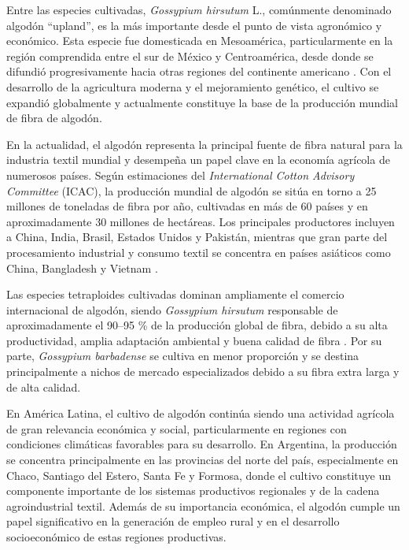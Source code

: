 \documentclass[12pt,oneside]{reedthesis}
\begin{document}
Entre las especies cultivadas, \emph{Gossypium hirsutum} L., comúnmente denominado algodón ``upland'', es la más importante desde el punto de vista agronómico y económico. Esta especie fue domesticada en Mesoamérica, particularmente en la región comprendida entre el sur de México y Centroamérica, desde donde se difundió progresivamente hacia otras regiones del continente americano \autocite{brubaker1999}. Con el desarrollo de la agricultura moderna y el mejoramiento genético, el cultivo se expandió globalmente y actualmente constituye la base de la producción mundial de fibra de algodón.

En la actualidad, el algodón representa la principal fuente de fibra natural para la industria textil mundial y desempeña un papel clave en la economía agrícola de numerosos países. Según estimaciones del \emph{International Cotton Advisory Committee} (ICAC), la producción mundial de algodón se sitúa en torno a 25 millones de toneladas de fibra por año, cultivadas en más de 60 países y en aproximadamente 30 millones de hectáreas. Los principales productores incluyen a China, India, Brasil, Estados Unidos y Pakistán, mientras que gran parte del procesamiento industrial y consumo textil se concentra en países asiáticos como China, Bangladesh y Vietnam \autocite{icac2025}.

Las especies tetraploides cultivadas dominan ampliamente el comercio internacional de algodón, siendo \emph{Gossypium hirsutum} responsable de aproximadamente el 90--95 \% de la producción global de fibra, debido a su alta productividad, amplia adaptación ambiental y buena calidad de fibra \autocite{grover2015}. Por su parte, \emph{Gossypium barbadense} se cultiva en menor proporción y se destina principalmente a nichos de mercado especializados debido a su fibra extra larga y de alta calidad.

En América Latina, el cultivo de algodón continúa siendo una actividad agrícola de gran relevancia económica y social, particularmente en regiones con condiciones climáticas favorables para su desarrollo. En Argentina, la producción se concentra principalmente en las provincias del norte del país, especialmente en Chaco, Santiago del Estero, Santa Fe y Formosa, donde el cultivo constituye un componente importante de los sistemas productivos regionales y de la cadena agroindustrial textil. Además de su importancia económica, el algodón cumple un papel significativo en la generación de empleo rural y en el desarrollo socioeconómico de estas regiones productivas.
\end{document}
